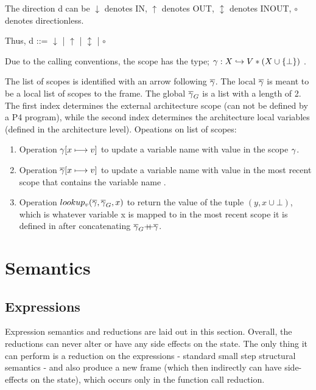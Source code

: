\documentclass[UTF8]{article}
\begin{document}
The direction d can be $\downarrow$ denotes IN, $\uparrow$ denotes OUT, $\updownarrow$ denotes INOUT, $\circ$ denotes directionless. 

Thus,
d ::= $\downarrow$ | $\uparrow$ | $\updownarrow$ | $\circ$

Due to the calling conventions, the scope has the type; $ \gamma : X \hookrightarrow V * (X \cup \{ \bot \})  $ .

The list of scopes is identified with an arrow following $\overline{\gamma}$.
The local $\overline{\gamma}$ is meant to be a local list of scopes to the frame. The global $\overline{\gamma}_G$ is a list with a length of 2. The first index determines the external architecture scope (can not be defined by a P4 program), while the second index determines the architecture local variables (defined in the architecture level).
Opeations on list of scopes:
\begin{enumerate}
    \setlength{\itemsep}{1pt}
    \setlength{\parskip}{0pt}
    \setlength{\parsep}{0pt}
\item Operation $\gamma [x \longmapsto v]$ to update a variable name \vn{} with value \cval{} in the scope $\gamma$. 
\item Operation $\overline{\gamma} [x \longmapsto v]$ to update a variable name \vn{} with value \cval{} in the most recent scope that contains the variable name \vn{}.   
\item Operation $lookup_v(\overline{\gamma}, \overline{\gamma}_G, x)$ to return the value \cval{} of the tuple $(y, x \cup {\bot})$, which is whatever variable x is mapped to in the most recent scope it is defined in after concatenating $\overline{\gamma}_G {+}\mspace{-8mu}{+} \overline{\gamma}$. 
\end{enumerate}







\newpage

\section{Semantics}

\subsection{Expressions}\label{sec:expsem}
Expression semantics and reductions are laid out in this section. Overall, the reductions can never alter or have any side effects on the state. The only thing it can perform is a reduction on the expressions - standard small step structural semantics - and also produce a new frame (which then indirectly can have side-effects on the state), which occurs only in the function call reduction.  
\end{document}

